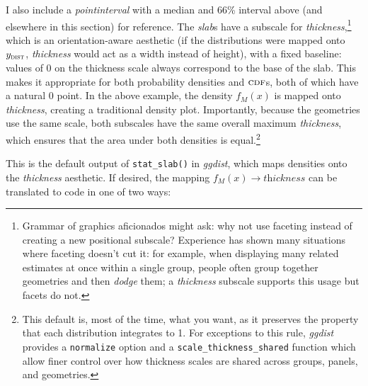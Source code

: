 \documentclass[journal]{vgtc}              %
\begin{document}
I also include a \textit{pointinterval} with a median and 66\% interval above (and elsewhere in this section) for reference. The \textit{slab}s have a subscale for \textit{thickness},\footnote{Grammar of graphics aficionados might ask: why not use faceting instead of creating a new positional subscale? Experience has shown many situations where faceting doesn't cut it: for example, when displaying many related estimates at once within a single group, people often group together geometries and then \textit{dodge} them; a \textit{thickness} subscale supports this usage but facets do not.} which is an orientation-aware aesthetic (if the distributions were mapped onto $y_\textsc{dist}$, \textit{thickness} would act as a width instead of height), with a fixed baseline: values of 0 on the thickness scale always correspond to the base of the slab. This makes it appropriate for both probability densities and $\textsc{cdf}$s, both of which have a natural 0 point. In the above example, the density $f_M(x)$ is mapped onto \textit{thickness}, creating a traditional density plot. Importantly, because the geometries use the same scale, both subscales have the same overall maximum \textit{thickness}, which ensures that the area under both densities is equal.\footnote{This default is, most of the time, what you want, as it preserves the property that each distribution integrates to 1. For exceptions to this rule, \textit{ggdist} provides a \texttt{normalize} option and a \texttt{scale\_thickness\_shared} function which allow finer control over how thickness scales are shared across groups, panels, and geometries.} 

This is the default output of \texttt{stat\_slab()} in \textit{ggdist}, which maps densities onto the \textit{thickness} aesthetic. If desired, the mapping $f_M(x) \rightarrow \textit{thickness}$ can be translated to code in one of two ways:
\end{document}
